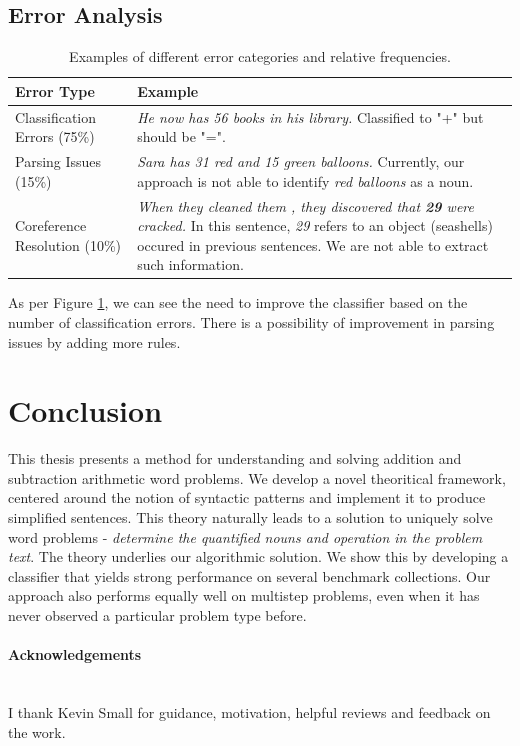 \documentclass[11pt]{article}
\begin{document}
\subsection{Error Analysis}\label{sec:erroranalysis}
\begin{table}[h!]
\begin{center}
\begin{tabular}{|>{\centering\arraybackslash}m{8em}|>{\centering\arraybackslash}m{20em}|}
\hline
\bf Error Type & \bf Example \\
\hline
Classification Errors (75\%) & \textit{He now has 56 books in his library.} \newline Classified to "+" but should be "=". \\
\hline
Parsing Issues (15\%) & \textit{Sara has 31 red and 15 green balloons.} \newline Currently, our approach is not able to identify \textit{red balloons} as a noun.\\
\hline
Coreference Resolution (10\%) & \textit{When they cleaned them , they discovered that \textbf{29} were cracked.} \newline In this sentence, \textit{29} refers to an object (seashells) occured in previous sentences. We are not able to extract such information.\\
\hline
\end{tabular}
\caption{Examples of different error categories and relative frequencies.}
\label{figure:25}
\end{center}
\end{table}

As per Figure \ref{figure:25}, we can see the need to improve the classifier based on the number of classification errors. There is a possibility of improvement in parsing issues by adding more rules. 

\section{Conclusion}\label{sec:conclusion}
This thesis presents a method for understanding and solving addition and subtraction arithmetic word problems. We develop a novel theoritical framework, centered around the notion of syntactic patterns and implement it to produce simplified sentences. This theory naturally leads to a solution to uniquely solve word problems - \textit{determine the quantified nouns and operation in the problem text}. The theory underlies our algorithmic solution. We show this by developing a classifier that yields strong performance on several benchmark collections. Our approach also performs equally well on multistep problems, even when it has never observed a particular problem type before.


\paragraph{Acknowledgements} \hspace{0pt} \\
I thank Kevin Small for guidance, motivation, helpful reviews and feedback on the work.

\newpage


\end{document}
